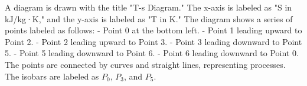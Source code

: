 A diagram is drawn with the title "T-s Diagram." The x-axis is labeled as "S in kJ/kg·K," and the y-axis is labeled as "T in K." The diagram shows a series of points labeled as follows:  
- Point 0 at the bottom left.  
- Point 1 leading upward to Point 2.  
- Point 2 leading upward to Point 3.  
- Point 3 leading downward to Point 5.  
- Point 5 leading downward to Point 6.  
- Point 6 leading downward to Point 0.  
The points are connected by curves and straight lines, representing processes. The isobars are labeled as \( P_0 \), \( P_3 \), and \( P_5 \).